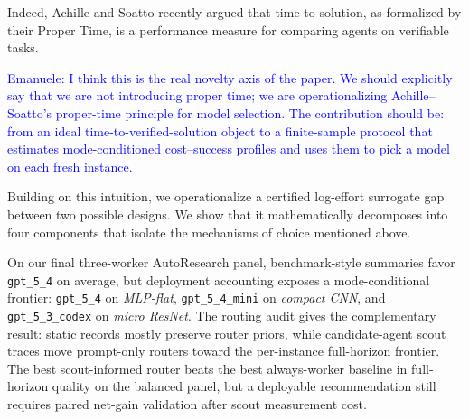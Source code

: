 \documentclass{article}
\begin{document}
Indeed, Achille and Soatto \citep{achille2025agents} recently argued that time to solution, as formalized by their Proper Time, is a performance measure for comparing agents on verifiable tasks.

\textcolor{blue}{Emanuele: I think this is the real novelty axis of the paper. We should explicitly say that we are not introducing proper time; we are operationalizing Achille--Soatto's proper-time principle for model selection. The contribution should be: from an ideal time-to-verified-solution object to a finite-sample protocol that estimates mode-conditioned cost--success profiles and uses them to pick a model on each fresh instance.}

Building on this intuition, we operationalize a certified log-effort surrogate gap between two possible designs. We show that it mathematically decomposes into four components that isolate the mechanisms of choice mentioned above.

On our final three-worker AutoResearch panel, benchmark-style summaries favor \texttt{gpt\_5\_4} on average, but deployment accounting exposes a mode-conditional frontier: \texttt{gpt\_5\_4} on \textit{MLP-flat}, \texttt{gpt\_5\_4\_mini} on \textit{compact CNN}, and \texttt{gpt\_5\_3\_codex} on \textit{micro ResNet}.
The routing audit gives the complementary result: static records mostly preserve router priors, while candidate-agent scout traces move prompt-only routers toward the per-instance full-horizon frontier.
The best scout-informed router beats the best always-worker baseline in full-horizon quality on the balanced panel, but a deployable recommendation still requires paired net-gain validation after scout measurement cost.


\end{document}
